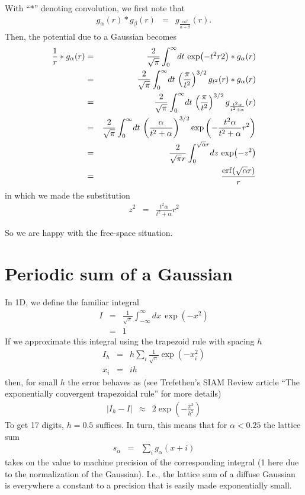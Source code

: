 \documentclass[12pt]{article}
\begin{document}
With ``$*$'' denoting convolution, we first note that
\begin{eqnarray}
  g_\alpha(r) * g_\beta(r) & = & g_{\frac{\alpha \beta}{\alpha+\beta}}(r) .
\end{eqnarray}
Then, the potential due to a Gaussian becomes
\begin{eqnarray}
  \frac{1}{r} * g_\alpha(r) & = & \frac{2}{\sqrt{\pi}} \int_0^\infty \! dt \, \exp(-t^2 r2) * g_\alpha(r)\\
  & = & \frac{2}{\sqrt{\pi}} \int_0^\infty \! dt \, \left( \frac{\pi}{t^2} \right)^{3/2}  g_{t^2}(r) * g_\alpha(r) \\
  & = & \frac{2}{\sqrt{\pi}} \int_0^\infty \! dt \, \left( \frac{\pi}{t^2} \right)^{3/2}  g_{\frac{t^2 \alpha}{t^2 + \alpha}}(r) \\
  & = & \frac{2}{\sqrt{\pi}} \int_0^\infty \! dt \, \left( \frac{\alpha}{t^2 + \alpha} \right)^{3/2}  \exp\left(-\frac{t^2 \alpha}{t^2 + \alpha} r^2 \right) \\
  & = & \frac{2}{\sqrt{\pi}r} \int_0^{\sqrt{\alpha} r} \! dz \, \exp(-z^2) \\
  & = & \frac{\erf(\sqrt{\alpha} r)}{r}
\end{eqnarray}
in which we made the substitution 
\begin{eqnarray}
  z^2 & = & \frac{t^2 \alpha}{t^2 + \alpha} r^2
\end{eqnarray}

So we are happy with the free-space situation.

\section{Periodic sum of a Gaussian}

In 1D, we define the familiar integral
\begin{eqnarray}
  I & = & \frac{1}{\sqrt{\pi}} \int_{-\infty}^\infty \! dx \, \exp(-x^2) \\
    & = & 1
\end{eqnarray}
If we approximate this integral using the trapezoid rule with spacing $h$
\begin{eqnarray}
  I_h & = & h \sum_i \frac{1}{\sqrt{\pi}} \exp(-x_i^2) \\
  x_i    & = & i h
\end{eqnarray}
then, for small $h$ the error behaves as (see Trefethen's SIAM Review article ``The exponentially convergent trapezoidal rule'' for more details)
\begin{eqnarray}
  | I_h - I | & \approx & 2 \exp\left( -\frac{\pi^2}{h^2} \right)
\end{eqnarray}
To get 17 digits, $h=0.5$ suffices.  In turn, this means that for $\alpha < 0.25$ the lattice sum
\begin{eqnarray}
  s_\alpha & = & \sum_i g_\alpha(x+i) 
\end{eqnarray}
takes on the value to machine precision of the corresponding integral (1 here due to the normalization of the Gaussian).  I.e., the lattice sum of a diffuse Gaussian is everywhere a constant to a precision that is easily made exponentially small.
\end{document}
